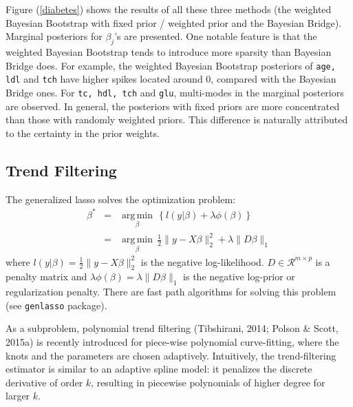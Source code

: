 \documentclass[12pt]{TD-CJS}
\newcommand{\R}{\mathcal{R}}
\DeclareMathOperator*{\argmin}{arg\,min}
\begin{document}
Figure (\ref{diabetes}) shows the results of all these three methods (the weighted Bayesian Bootstrap with fixed prior / weighted prior and the Bayesian Bridge). Marginal posteriors for $\beta_j$'s are presented. One notable feature is that the weighted Bayesian Bootstrap tends to introduce more sparsity than Bayesian Bridge does. For example, the weighted Bayesian Bootstrap posteriors of {\tt age, ldl} and {\tt tch} have higher spikes located around 0, compared with the Bayesian Bridge ones. For {\tt tc, hdl, tch} and {\tt glu}, multi-modes in the marginal posteriors are observed. In general, the posteriors with fixed priors are more concentrated than those with randomly weighted priors. This difference is naturally attributed to the certainty in the prior weights.


\subsection{Trend Filtering}
The generalized lasso solves the optimization problem:
\begin{eqnarray}
\beta^* &=& \underset{\beta}{\argmin} \, \left\{ l(y|\beta) + \lambda\phi(\beta)  \right\}\\
&=& \underset{\beta}{\argmin} \, \frac{1}{2}\|y - X\beta\|_2^2 + \lambda \|D\beta\|_1
\end{eqnarray}
where $ l(y|\beta) = \frac{1}{2}\|y - X\beta\|_2^2 $ is the negative log-likelihood. $D \in \R^{m\times p}$ is a penalty matrix and $ \lambda\phi(\beta) = \lambda \|D\beta\|_1$ is the negative log-prior or regularization penalty. There are fast path algorithms for solving this problem (see {\tt genlasso} package).

As a subproblem, polynomial trend filtering (Tibshirani, 2014; Polson \& Scott, 2015a) is recently introduced for piece-wise polynomial curve-fitting, where the knots and the parameters are chosen adaptively. Intuitively, the trend-filtering estimator is similar to an adaptive spline model: it penalizes the discrete derivative of order $k$, resulting in piecewise polynomials of higher degree for larger $k$.
\end{document}
